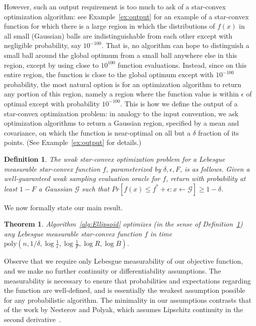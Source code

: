 \documentclass[11pt,letter]{article}
\renewcommand{\poly}{\mathrm{poly}}
\newcommand{\ferr}{\epsilon}
\newcommand{\perr}{\delta}
\newcounter{nTheorems}
\numberwithin{nTheorems}{section}
\newtheorem{theorem}[nTheorems]{Theorem}
\newtheorem{definition}[nTheorems]{Definition}
\begin{document}
However, such an output requirement is too much to ask of a star-convex optimization algorithm: see Example~\ref{ex:output} for an example of a star-convex function for which there is a large region in which the distributions of $f(x)$ in all small (Gaussian) balls are indistinguishable from each other except with negligible probability, say $10^{-100}$. That is, no algorithm can hope to distinguish a small ball around the global optimum from a small ball anywhere else in this region, except by using close to $10^{100}$ function evaluations. Instead, since on this entire region, the function is close to the global optimum except with $10^{-100}$ probability, the most natural option is for an optimization algorithm to return any portion of this region, namely a region where the function value is within $\ferr$ of optimal except with probability $10^{-100}$. This is how we define the output of a star-convex optimization problem: in analogy to the input convention, we ask optimization algorithms to return a Gaussian region, specified by a mean and covariance, on which the function is near-optimal on all but a $\perr$ fraction of its points. (See Example~\ref{ex:output} for details.)





\begin{definition}\label{def:problem}
  The \emph{weak star-convex optimization problem} for a Lebesgue measurable star-convex function $f$, parameterized by $\perr,\ferr, F$, is as follows.
Given a well-guaranteed weak sampling evaluation oracle for $f$, return with probability at least $1-F$ a Gaussian $\mathcal{G}$ such that $Pr[f(x) \le f^\ast+\ferr:x\leftarrow \mathcal{G}]\ge 1-\perr$.
\end{definition}

We now formally state our main result.
\begin{theorem}\label{thm:main}
Algorithm~\ref{alg:Ellipsoid} optimizes (in the sense of Definition~\ref{def:problem}) any Lebesgue measurable star-convex function $f$ in time $\poly(n,1/\perr,\log\frac{1}{\ferr},\log\frac{1}{F},\log R,\log B)$.
\end{theorem}

Observe that we require only Lebesgue measurability of our objective function, and we make no further continuity or differentiability assumptions.
The measurability is necessary to ensure that probabilities and expectations regarding the function are well-defined, and is essentially the weakest assumption possible for any probabilistic algorithm.
The minimality in our assumptions contrasts that of the work by Nesterov and Polyak, which assumes Lipschitz continuity in the second derivative~\cite{Nesterov:2006}.
\end{document}
